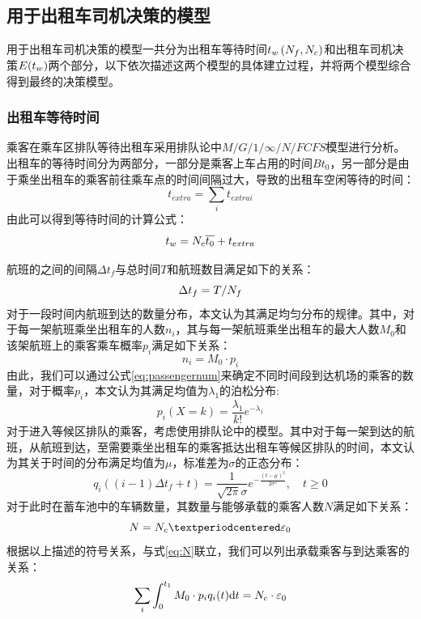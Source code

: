 \documentclass{cumcm}
\begin{document}
\subsection{用于出租车司机决策的模型}
用于出租车司机决策的模型一共分为出租车等待时间$\mbox{$t_w$}\left(\mbox{$N_f$},\mbox{$N_c$}\right)$和出租车司机决策$E(\mbox{$t_w$})$两个部分，以下依次描述这两个模型的具体建立过程，并将两个模型综合得到最终的决策模型。
\subsubsection{出租车等待时间}
乘客在乘车区排队等待出租车采用排队论中$M/G/1/\infty/N/FCFS$模型进行分析。出租车的等待时间分为两部分，一部分是乘客上车占用的时间$Bt_0$，另一部分是由于乘坐出租车的乘客前往乘车点的时间间隔过大，导致的出租车空闲等待的时间：
\begin{equation}
	t_{extra}=\sum_it_{extrai}
	\label{eq:textrafunc}
\end{equation}
由此可以得到等待时间\waittime 的计算公式：
\begin{equation}
	\mbox{$t_w$}=\mbox{$N_c$}\overline{t_0}+t_{extra}
	\label{eq:tfunc}
\end{equation}
\par
航班的之间的间隔$\Delta t_f$与总时间$T$和航班数目\flightnum 满足如下的关系：
\begin{equation}
	\Delta t_f=T/\mbox{$N_f$}
	\label{eq:deltatf}
\end{equation}
对于一段时间内航班到达的数量分布，本文认为其满足均匀分布的规律。其中，对于每一架航班乘坐出租车的人数$n_i$，其与每一架航班乘坐出租车的最大人数$M_0$和该架航班上的乘客乘车概率$p_i$满足如下关系：
\begin{equation}
	n_i=M_0·p_i
	\label{eq:passengernum}
\end{equation}
由此，我们可以通过公式\ref{eq:passengernum}来确定不同时间段到达机场的乘客的数量，对于概率$p_i$，本文认为其满足均值为$\lambda_1$的泊松分布:
\begin{equation}
	p_i(X=k)=\frac{\lambda_1}{k!}e^{-\lambda_1}
	\label{eq:pi}
\end{equation}
对于进入等候区排队的乘客，考虑使用排队论中的模型。其中对于每一架到达的航班，从航班到达，至需要乘坐出租车的乘客抵达出租车等候区排队的时间，本文认为其关于时间的分布满足均值为$\mu$，标准差为$\sigma$的正态分布：
\begin{equation}
	q_i((i-1)\Delta t_f+t)=\frac{1}{\sqrt{2\pi}\sigma}e^{-\frac{(t-\mu)^2}{2\sigma^2}},\quad t\ge0
	\label{eq:qi}
\end{equation}
对于此时在蓄车池中的车辆数量，其数量\taxinum 与能够承载的乘客人数$N$满足如下关系：
\begin{equation}
	N=\mbox{\taxinum}·\varepsilon_0
	\label{eq:N}
\end{equation}
根据以上描述的符号关系，与式\ref{eq:N}联立，我们可以列出承载乘客与到达乘客的关系：
\begin{equation}
	\sum_i\int_0^{t_1}M_0\cdot p_iq_i(t)\mathrm{d}t=\mbox{$N_c$}\cdot\varepsilon_0
\end{equation}
\end{document}
